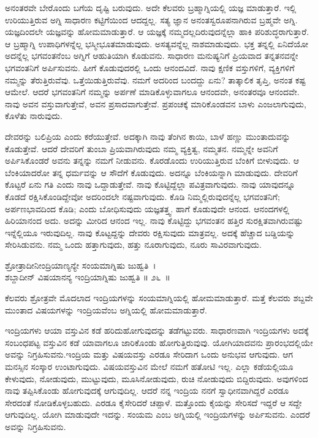 ಅನಂತರವೇ ಬೇರೊಂದು ಬಗೆಯ ದೃಷ್ಟಿ ಬರುವುದು. ಅದೇ ಕೆಲವರು ಬ್ರಹ್ಮಾಗ್ನಿಯಲ್ಲಿ ಯಜ್ಞ ಮಾಡುತ್ತಾರೆ. ಇಲ್ಲಿ ಉರಿಯುತ್ತಿರುವ ಅಗ್ನಿ ಸಾಧಾರಣ ಕಟ್ಟಿಗೆಯಿಂದ ಆದದ್ದಲ್ಲ. ಸತ್ಯ ಜ್ಞಾನ ಅನಂತಸ್ವರೂಪನಾಗಿರುವ ಬ್ರಹ್ಮವೇ ಅಗ್ನಿ. ಯಜ್ಞದಿಂದಲೇ ಯಜ್ಞವನ್ನು ಹೋಮ\-ಮಾಡುತ್ತಾರೆ. ಆ ಯಜ್ಞಕ್ಕೆ ನಮ್ಮದಲ್ಲದಿರುವುದನ್ನೆಲ್ಲಾ ಹಾಕಿ ಪರಿಶುದ್ಧರಾಗುತ್ತಾರೆ. ಆ ಬ್ರಹ್ಮಾಗ್ನಿ ಉಪಾಧಿಗಳನ್ನೆಲ್ಲ ಭಸ್ಮೀಭೂತಮಾಡುವುದು. ಅಸತ್ಯವನ್ನೆಲ್ಲ ನಾಶಮಾಡುವುದು. ಭಕ್ತ ತನ್ನಲ್ಲಿ ಏನಿದೆಯೋ ಅದನ್ನೆಲ್ಲ ಭಗವಂತನೆಂಬ ಅಗ್ನಿಗೆ ಆಹುತಿಯಾಗಿ ಕೊಡುವನು. ಸಾಧಾರಣ ಮನುಷ್ಯನಿಗೆ ಪ್ರಿಯವಾದ ತನ್ನತನವನ್ನೇ ಭಗವಂತನಿಗೆ ಅರ್ಪಿಸುವನು. ಹೀಗೆ ಕೊಡುವುದರಲ್ಲಿ ಒಂದು ಆನಂದವಿದೆ. ನಾವು ಕ್ಷಣಿಕ ವಸ್ತುಗಳಿಗೆ, ವ್ಯಕ್ತಿಗಳಿಗೆ ನಮ್ಮನ್ನು ತೆರುತ್ತಿರುವೆವು. ಒತ್ತೆಯಿಡುತ್ತಿರುವೆವು. ನಮಗೆ ಅದರಿಂದ ಬಂದದ್ದು ಏನು? ತಾತ್ಕಾಲಿಕ ತೃಪ್ತಿ, ಅನಂತ ಕಷ್ಟ ಆಮೇಲೆ. ಆದರೆ ಭಗವಂತನಿಗೆ ನಮ್ಮನ್ನು ಅರ್ಪಣೆ ಮಾಡಿಕೊಳ್ಳುವಾಗಲೂ ಆನಂದವೇ, ಅನಂತರವೂ ಆನಂದವೇ. ನಾವು ಅವನ ವಸ್ತುವಾಗುತ್ತೇವೆ, ಅವನ ಪ್ರಸಾದವಾಗುತ್ತೇವೆ. ಪ್ರಪಂಚಕ್ಕೆ ಮಾರಿಕೊಂಡವನ ಬಾಳು ಎಂಜಲಾಗುವುದು, ಕೊಳೆತು ನಾರುವುದು.

ದೇವರನ್ನು ಬಲಿಪ್ರಿಯ ಎಂದು ಕರೆಯುತ್ತೇವೆ. ಅದಕ್ಕಾಗಿ ನಾವು ತೆಂಗಿನ ಕಾಯಿ, ಬಾಳೆ ಹಣ್ಣು ಮುಂತಾದುವನ್ನು ಕೊಡುತ್ತೇವೆ. ಆದರೆ ದೇವರಿಗೆ ತುಂಬಾ ಪ್ರಿಯವಾಗಿರುವುದು ನಮ್ಮ ವ್ಯಕ್ತಿತ್ವ, ನಮ್ಮತನ. ನಮ್ಮನ್ನೇ ಅವನಿಗೆ ಅರ್ಪಿಸಿಕೊಂಡರೆ ಅವನು ತನ್ನನ್ನು ನಮಗೆ ನೀಡುವನು. ಕೊರಡೊಂದು ಉರಿಯುತ್ತಿರುವ ಬೆಂಕಿಗೆ ಬೀಳುವುದು. ಆ ಬೆಂಕಿಯಾದರೋ ತನ್ನ ಧರ್ಮವನ್ನು ಆ ಸೌದೆಗೆ ಕೊಡುವುದು. ಅದನ್ನೂ ಬೆಂಕಿಯನ್ನಾಗಿ ಮಾಡುವುದು. ದೇವರಿಗೆ ಕೊಟ್ಟರೆ ಏನು ಗತಿ ಎಂದು ನಾವು ಒದ್ದಾಡುತ್ತೇವೆ. ನಾವು ಕೊಟ್ಟಿದ್ದೆಲ್ಲಾ ಪವಿತ್ರವಾಗುವುದು. ನಾವು ಯಾವುದನ್ನೂ ಕೊಡದೆ ರಕ್ಷಿಸಿಕೊಂಡಿದ್ದೇವೋ ಅದರಿಂದಲೇ ನಷ್ಟವಾಗುವುದು. ಕೊಡಿ ನಿಮ್ಮಲ್ಲಿರುವುದನ್ನೆಲ್ಲ ಭಗವಂತನಿಗೆ; ಅರ್ಪಣಭಾವದಿಂದ ಕೊಡಿ; ಎಂದು ಬೋಧಿಸುವುದು ಯಜ್ಞತತ್ತ್ವ. ಹಾಗೆ ಕೊಡುವುದೇ ಆನಂದ. ಆನಂದಗಳಲ್ಲಿ ಹಿರಿಯಾನಂದ ಅದು. ಅದನ್ನು ಮೀರಿದ ಆನಂದ ಇಲ್ಲ. ನಾವು ಕೊಟ್ಟಿದ್ದು ಭಗವಂತನ ಹತ್ತಿರ ಸುರಕ್ಷಿತವಾಗಿರುವಷ್ಟು ಇನ್ನೆಲ್ಲಿಯೂ ಇರುವುದಿಲ್ಲ. ನಾವು ಕೊಟ್ಟದ್ದನ್ನು ದೇವರು ರಕ್ಷಿಸುವುದು ಮಾತ್ರವಲ್ಲ. ಅದಕ್ಕೆ ಹೆಚ್ಚಾದ ಬಡ್ಡಿಯನ್ನು ಸೇರಿಸಿಡುವನು. ನಮ್ಮ ಒಂದು ಹತ್ತಾಗುವುದು, ಹತ್ತು ನೂರಾಗುವುದು, ನೂರು ಸಾವಿರವಾಗುವುದು.

\begin{shloka}
ಶ್ರೋತ್ರಾದೀನೀಂದ್ರಿಯಾಣ್ಯನ್ಯೇ ಸಂಯಮಾಗ್ನಿಷು ಜುಹ್ವತಿ~।\\ಶಬ್ದಾದೀನ್ ವಿಷಯಾನನ್ಯ ಇಂದ್ರಿಯಾಗ್ನಿಷು ಜುಹ್ವತಿ \hfill॥ ೨೬~॥
\end{shloka}

\begin{artha}
ಕೆಲವರು ಶ್ರೋತ್ರವೇ ಮೊದಲಾದ ಇಂದ್ರಿಯಗಳನ್ನು ಸಂಯಮಾಗ್ನಿಯಲ್ಲಿ ಹೋಮಮಾಡುತ್ತಾರೆ. ಮತ್ತೆ ಕೆಲವರು ಶಬ್ದವೇ ಮುಂತಾದ ವಿಷಯಗಳನ್ನು ಇಂದ್ರಿಯವೆಂಬ ಅಗ್ನಿಯಲ್ಲಿ ಹೋಮ\-ಮಾಡುತ್ತಾರೆ.
\end{artha}

ಇಂದ್ರಿಯಗಳು ಆಯಾ ವಸ್ತುವಿನ ಕಡೆ ಹರಿದುಹೋಗುವುದನ್ನು ತಡೆಗಟ್ಟುವರು. ಸಾಧಾರಣವಾಗಿ ಇಂದ್ರಿಯಗಳು ಅದಕ್ಕೆ ಸಂಬಂಧಪಟ್ಟ ವಸ್ತುವಿನ ಕಡೆ ಯಾವಾಗಲೂ ಜಾರಿಕೊಂಡು ಹೋಗುತ್ತಿರುವುವು. ಯೋಗಿಯಾದವನು ಪ್ರಾರಂಭದಲ್ಲಿಯೇ ಅವನ್ನು ನಿಗ್ರಹಿಸುವನು.\break ಇಂದ್ರಿಯ ಮತ್ತು ವಿಷಯವಸ್ತು ಎರಡೂ ಸೇರಿದಾಗ ಒಂದು ಅನುಭವ ಆಗುವುದು. ಆಗ ಮನಸ್ಸಿನ ಸಂಸ್ಕಾರ ಉಂಟಾಗುವುದು. ವಿಷಯವಸ್ತುವಿನ ಮೇಲೆ ನಮಗೆ ಹತೋಟಿ ಇಲ್ಲ. ಎಲ್ಲಾ ಕಡೆಯಲ್ಲಿಯೂ ಕೇಳುವುದು, ನೋಡುವುದು, ಮುಟ್ಟುವುದು, ಮೂಸಿನೋಡುವುದು, ರುಚಿ ನೋಡುವುದು ಬಿದ್ದಿರುವುದು. ಅವುಗಳಿಂದ ನಾವು ತಪ್ಪಿಸಿಕೊಂಡು ಹೋಗುವುದಕ್ಕೆ ಆಗುವುದಿಲ್ಲ. ಆದರೆ ನನ್ನ ಇಂದ್ರಿಯ ನನಗೆ ಸ್ವಾಧೀನವಾಗಿದ್ದರೆ ಎರಡೂ ಸೇರದಂತೆ ನೋಡಿಕೊಳ್ಳಬಹುದು. ಎರಡೂ ಕೈಸೇರಿದರೆ ಚಪ್ಪಾಳೆ. ಮತ್ತೊಂದು ಕೈಯನ್ನು ಸೇರಿಸದೆ ಇದ್ದರೆ ಆ ಸದ್ದೇ ಆಗುವುದಿಲ್ಲ. ಯೋಗಿ ಮಾಡುವುದೇ ಇದನ್ನು. ಸಂಯಮ ಎಂಬ ಅಗ್ನಿಯಲ್ಲಿ ಇಂದ್ರಿಯಗಳನ್ನು ಅರ್ಪಿಸುವನು. ಎಂದರೆ ಅವನ್ನು ನಿಗ್ರಹಿಸುವನು.


